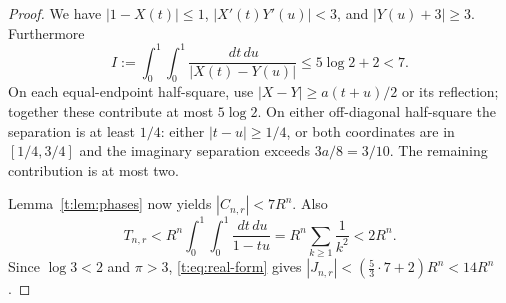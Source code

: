 \documentclass[10pt,a4paper]{amsart}
\newcommand{\dd}{\,d}
\begin{document}
\begin{proof}
We have $|1-X(t)|\le1$, $|X'(t)Y'(u)|<3$, and $|Y(u)+3|\ge3$.
Furthermore
\[
 I:=\int_0^1\!\int_0^1\frac{\dd t\dd u}{|X(t)-Y(u)|}
 \le5\log2+2<7.
\]
On each equal-endpoint half-square, use
$|X-Y|\ge a(t+u)/2$ or its reflection; together these contribute at most
$5\log2$. On either off-diagonal half-square the separation is at least
$1/4$: either $|t-u|\ge1/4$, or both coordinates are in $[1/4,3/4]$ and
the imaginary separation exceeds $3a/8=3/10$. The remaining contribution
is at most two.

Lemma~\ref{t:lem:phases} now yields $|C_{n,r}|<7R^n$. Also
\[
 T_{n,r}<R^n\int_0^1\!\int_0^1\frac{\dd t\dd u}{1-tu}
 =R^n\sum_{k\ge1}\frac1{k^2}<2R^n.
\]
Since $\log3<2$ and $\pi>3$, \eqref{t:eq:real-form} gives
$|J_{n,r}|<(\frac53\cdot7+2)R^n<14R^n$.
\end{proof}
\end{document}
